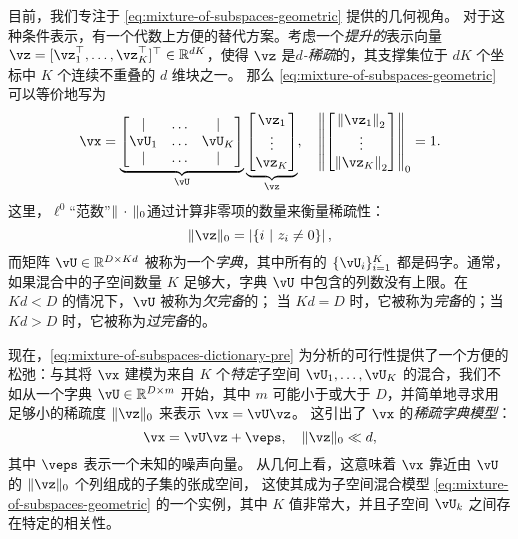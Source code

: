 \documentclass[../../book-main_zh.tex]{subfiles}
\begin{document}
目前，我们专注于 \eqref{eq:mixture-of-subspaces-geometric} 提供的几何视角。
对于这种条件表示，有一个代数上方便的替代方案。考虑一个\textit{提升的}表示向量 $\vz = [\vz_1^\top, \dots, \vz_K^\top]^\top \in \R^{dK}$，使得 $\vz$ 是\textit{$d$-稀疏}的，其支撑集位于 $dK$ 个坐标中 $K$ 个连续不重叠的 $d$ 维块之一。
那么 \eqref{eq:mixture-of-subspaces-geometric} 可以等价地写为
\begin{equation}\label{eq:mixture-of-subspaces-dictionary-pre}
    \vx = 
    \underbrace{
    \begin{bmatrix} 
    | & \hdots & |  \\
    \vU_1 & \hdots & \vU_K  \\
    | & \hdots & | 
    \end{bmatrix} 
    }_{\vU}
    \underbrace{
    \begin{bmatrix} \vz_1 \\ \vdots \\ \vz_K \end{bmatrix}
    }_{\vz},
    \quad
    \norm*{
    \begin{bmatrix} \norm*{\vz_1}_2 \\ \vdots \\ \norm*{\vz_K}_2 \end{bmatrix}
    }_0 = 1.
\end{equation}
这里，$\ell^0$“范数”$\norm{\,\cdot\,}_0$通过计算非零项的数量来衡量稀疏性：
\begin{equation}\label{eq:ell-zero-norm}
    \norm{\vz}_0 = \abs*{\set{i \given z_i \neq 0}},
\end{equation}
而矩阵 $\vU \in \R^{D \times Kd}$ 被称为一个\textit{字典}，其中所有的 $\{\vU_i\}_{i=1}^K$ 都是码字。通常，如果混合中的子空间数量 $K$ 足够大，字典 $\vU$ 中包含的列数没有上限。在 $Kd < D$ 的情况下，$\vU$ 被称为\textit{欠完备}的；
当 $Kd = D$ 时，它被称为\textit{完备}的；当 $Kd > D$ 时，它被称为\textit{过完备}的。

现在，\eqref{eq:mixture-of-subspaces-dictionary-pre} 为分析的可行性提供了一个方便的松弛：与其将 $\vx$ 建模为来自 $K$ 个\textit{特定}子空间 $\vU_1, \dots, \vU_K$ 的混合，我们不如从一个字典 $\vU \in \R^{D \times m}$ 开始，其中 $m$ 可能小于或大于 $D$，并简单地寻求用足够小的稀疏度 $\norm{\vz}_0$ 来表示 $\vx = \vU \vz$。
这引出了 $\vx$ 的\textit{稀疏字典模型}：
\begin{equation}\label{eq:mixture-of-subspaces-dictionary}
    \vx =  \vU \vz + \veps,
    \quad
    \norm{\vz}_0 \ll d,
\end{equation}
其中 $\veps$ 表示一个未知的噪声向量。
从几何上看，这意味着 $\vx$ 靠近由 $\vU$ 的 $\norm{\vz}_0$ 个列组成的子集的张成空间，
这使其成为子空间混合模型 \eqref{eq:mixture-of-subspaces-geometric} 的一个实例，其中 $K$ 值非常大，并且子空间 $\vU_k$ 之间存在特定的相关性。
\end{document}
